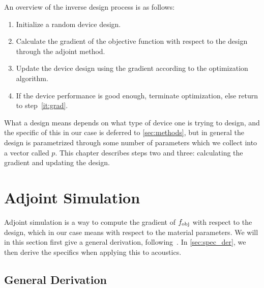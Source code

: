 An overview of the inverse design process is as follows:
\begin{enumerate}
	\item Initialize a random device design.
	\item\label{it:grad} Calculate the gradient of the objective function with
		respect to the design through the adjoint method.
	\item Update the device design using the gradient according to the optimization algorithm.
	\item If the device performance is good enough, terminate optimization, else
		return to step~\ref{it:grad}.
\end{enumerate}

What a design means depends on what type of device one is trying to design, and
the specific of this in our case is deferred to \cref{sec:methods}, but in
general the design is parametrized through some number of parameters which we collect
into a vector called $p$.
This chapter describes steps two and three: calculating the gradient and
updating the design.

\section{Adjoint Simulation}

Adjoint simulation is a way to compute the gradient of $f_\text{obj}$ with respect to
the design, which in our case means with respect to the material parameters.
We will in this section first give a general derivation,
following~\cite{giles_introduction_2000}.
In \cref{sec:spec_der}, we then derive the specifics when applying this to
acoustics.

\subsection{General Derivation}\label{sec:general_derivation}

